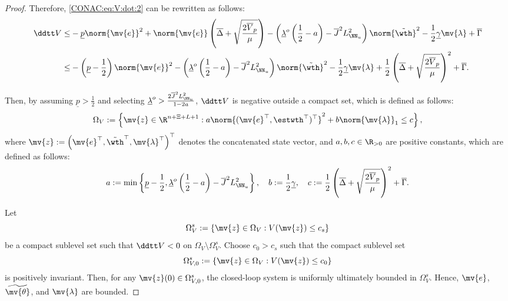 \begin{proof}
Therefore, \eqref{CONAC:eq:V:dot:2} can be rewritten as follows:
\begin{align}
  \label{CONAC:eq:V:dot:3}
  \ddtt V
  \le &
  -\underline{p}\norm{\mv{e}}^2
  +
  \norm{\mv{e}}
  \left(
    \overline{\Delta}
    +
    \sqrt{\frac{2\overline{V}_p}{\mu}}
  \right)
  -
  \left(
    \underline{\lambda}^o
    \left(
      \frac{1}{2}
      -
      a
    \right)
    -
    \overline{J}^2L_{\NN_u}^2
  \right)
  \norm{\tilde{\wth}}^2
  -
  \frac{1}{2}\underline{\gamma}
  \mv{\lambda}
  +
  \overline{\Gamma}
  \\ \nonumber
  \le &
  -
  \left(
    \underline{p}
    -
    \frac{1}{2}
  \right)
  \norm{\mv{e}}^2
  -
  \left(
    \underline{\lambda}^o
    \left(
      \frac{1}{2}
      -
      a
    \right)
    -
    \overline{J}^2L_{\NN_u}^2
  \right)
  \norm{\tilde{\wth}}^2
  -
  \frac{1}{2}\underline{\gamma}
  \mv{\lambda}
  +
  \frac{1}{2}
  \left(
    \overline{\Delta}
    +
    \sqrt{\frac{2\overline{V}_p}{\mu}}
  \right)^2
  +
  \overline{\Gamma}
  .
\end{align}

Then, by assuming $\underline{p}>\frac{1}{2}$ and selecting $\underline{\lambda}^o>\frac{2\overline{J}^2L_{\NN_u}^2}{1-2a}$, $\ddtt V$ is negative outside a compact set, which is defined as follows:
\begin{equation}
  \label{CONAC:eq:compact:set}
  \Omega_V
  :=
  \left\{
  \mv{z}\in\R^{n+\Xi+L+1}
  :
  a
  \norm{
    (
      \mv{e}^\top
      ,
      {\estwth}^\top
    )^\top
  }^2
  +
  b
  \norm{\mv{\lambda}}_1
  \le
  c
  \right\}
  ,
\end{equation}
where $\mv{z}:=\left(\mv{e}^\top,\tilde{\wth}^\top,\mv{\lambda}^\top\right)^\top$ denotes the concatenated state vector, and $a,b,c\in\R_{>0}$ are positive constants, which are defined as follows:
\begin{equation}
  a
  :=
  \min\left\{
    \underline{p}-\frac{1}{2},
    \underline{\lambda}^o\left(\frac{1}{2}-a\right)-\overline{J}^2L_{\NN_u}^2
  \right\}
  ,
  \quad
  b
  :=
  \frac{1}{2}\underline{\gamma}
  ,
  \quad
  c
  :=
  \frac{1}{2}
  \left(
    \overline{\Delta}
    +
    \sqrt{\frac{2\overline{V}_p}{\mu}}
  \right)^2
  +
  \overline{\Gamma}
  .
\end{equation}

Let
\begin{equation}
  \Omega_V^s
  :=
  \left\{
    \mv{z}\in\Omega_V
    :
    V(\mv{z})\leq c_s
  \right\}
\end{equation}
be a compact sublevel set such that $\ddtt V<0$ on $\Omega_V\setminus\Omega_V^s$.
Choose $c_0>c_s$ such that the compact sublevel set
\begin{equation}
  \label{CONAC:eq:compact:set:sublevel}
  \Omega_{V,0}^s
  :=
  \left\{
    \mv{z}\in\Omega_V
    :
    V(\mv{z})\leq c_0
  \right\}
\end{equation}
is positively invariant. 
Then, for any $\mv{z}(0)\in\Omega_{V,0}^s$, the closed-loop system is uniformly ultimately bounded in $\Omega_V^s$. 
Hence, $\mv{e}$, $\widetilde{\mv{\theta}}$, and $\mv{\lambda}$ are bounded.


\end{proof}
